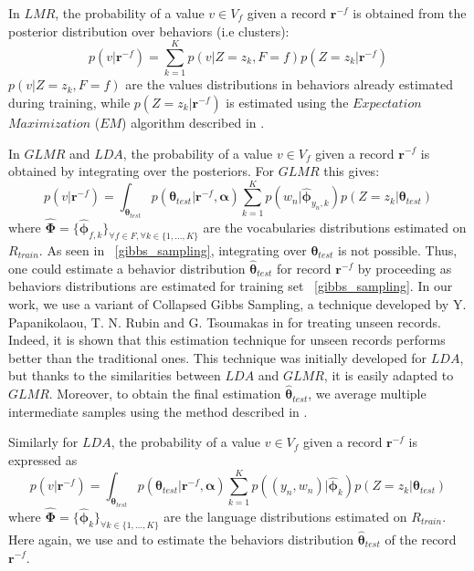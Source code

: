 In $LMR$, the probability of a value $v \in V_{f}$ given a record $\mathbf{r}^{-f}$ is obtained from the posterior distribution over behaviors (i.e clusters):
\begin{equation}
p(v|\mathbf{r}^{-f})=\sum_{k=1}^{K}p(v|Z=z_{k}, F=f)p(Z=z_{k}|\mathbf{r}^{-f})
\end{equation}
$p(v|Z=z_{k}, F=f)$ are the values distributions in behaviors already estimated during training, while $p(Z=z_{k}|\mathbf{r}^{-f})$ is estimated using the $Expectation$ $Maximization$ ($EM$) algorithm described in \cite{plsi}. \par

In $GLMR$ and $LDA$, the probability of a value $v \in V_{f}$ given a record $\mathbf{r}^{-f}$ is obtained by integrating over the posteriors. For $GLMR$ this gives:
\begin{equation}
p(v|\mathbf{r}^{-f})=\int_{\boldsymbol{\theta}_{test} }p(\boldsymbol{\theta}_{test}|\mathbf{r}^{-f},\boldsymbol{\alpha })\sum_{k=1}^{K}p(w_{n}|\boldsymbol{\widehat{\phi}  }_{y_{n},k})p(Z=z_{k}|\boldsymbol{\theta }_{test})
\end{equation}
where $\boldsymbol{\widehat{\Phi }}=\{\boldsymbol{\widehat{\phi} }_{f,k}\}_{\forall f \in F, \forall k\in\{1,...,K\}}$ are the vocabularies distributions estimated on $R_{train}$. As seen in ~\ref{gibbs_sampling}, integrating over $\boldsymbol{\theta}_{test}$ is not possible. Thus, one could estimate a behavior distribution $\boldsymbol{\widehat{\theta}}_{test}$ for record $\mathbf{r}^{-f}$ by proceeding as behaviors distributions are estimated for training set ~\ref{gibbs_sampling}. In our work, we use a variant of Collapsed Gibbs Sampling, a technique developed by Y. Papanikolaou, T. N. Rubin and G. Tsoumakas in \cite{gibbsunseen} for treating unseen records. Indeed, it is shown that this estimation technique for unseen records performs better than the traditional ones. This technique was initially developed for $LDA$, but thanks to the similarities between $LDA$ and $GLMR$, it is easily adapted to $GLMR$. Moreover, to obtain the final estimation $\boldsymbol{\widehat{\theta}}_{test}$, we average multiple intermediate samples using the method described in \cite{gibbsaverage}.

Similarly for $LDA$, the probability of a value $v \in V_{f}$ given a record $\mathbf{r}^{-f}$ is expressed as
\begin{equation}
p(v|\mathbf{r}^{-f})=\int_{\boldsymbol{\theta}_{test} }p(\boldsymbol{\theta}_{test}|\mathbf{r}^{-f},\boldsymbol{\alpha })\sum_{k=1}^{K}p((y_{n},w_{n})|\boldsymbol{\widehat{\phi}  }_{k})p(Z=z_{k}|\boldsymbol{\theta }_{test})
\end{equation}
where $\boldsymbol{\widehat{\Phi }}=\{\boldsymbol{\widehat{\phi} }_{k}\}_{\forall k\in\{1,...,K\}}$ are the language distributions estimated on $R_{train}$. Here again, we use \cite{gibbsunseen} and \cite{gibbsaverage} to estimate the behaviors distribution $\boldsymbol{\widehat{\theta}}_{test}$ of the record $\mathbf{r}^{-f}$. \par

